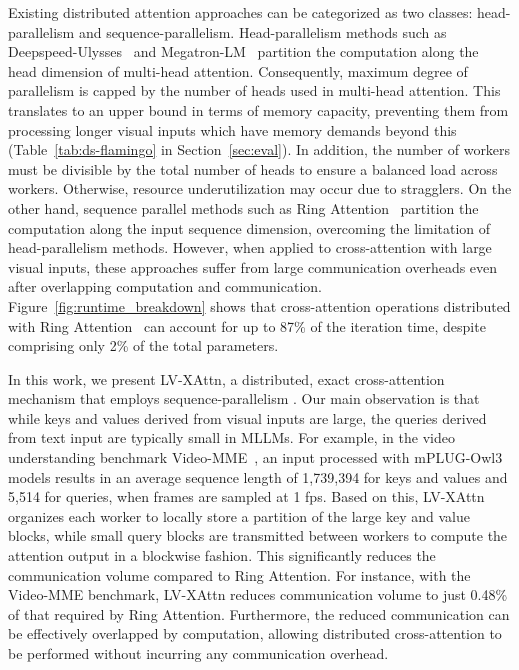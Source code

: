 Existing distributed attention approaches can be categorized as two classes: head-parallelism and sequence-parallelism. Head-parallelism methods such as Deepspeed-Ulysses~\cite{jacobs2024ds} and Megatron-LM~\cite{korthikanti2023megatron-lm} partition the computation along the head dimension of multi-head attention. Consequently, maximum degree of parallelism is capped by the number of heads used in multi-head attention. This translates to an upper bound in terms of memory capacity, preventing them from processing longer visual inputs which have memory demands beyond this (Table~\ref{tab:ds-flamingo} in Section~\ref{sec:eval}). In addition, the number of workers must be divisible by the total number of heads to ensure a balanced load across workers. Otherwise, resource underutilization may occur due to stragglers. On the other hand, sequence parallel methods such as Ring Attention~\cite{liu2024ring} partition the computation along the input sequence dimension, overcoming the limitation of head-parallelism methods. However, when applied to cross-attention with large visual inputs, these approaches suffer from large communication overheads even after overlapping computation and communication. Figure~\ref{fig:runtime_breakdown} shows that cross-attention operations distributed with Ring Attention~\cite{liu2024ring} can account for up to 87\% of the iteration time, despite comprising only 2\% of the total parameters.

In this work, we present LV-XAttn, a distributed, exact cross-attention mechanism that employs sequence-parallelism . Our main observation is that while keys and values derived from visual inputs are large, the queries derived from text input are typically small in MLLMs. For example, in the video understanding benchmark Video-MME~\cite{fu2024video-mme}, an input processed with mPLUG-Owl3 models results in an average sequence length of 1,739,394 for keys and values and 5,514 for queries, when frames are sampled at 1 fps. Based on this, LV-XAttn organizes each worker to locally store a partition of the large key and value blocks, while small query blocks are transmitted between workers to compute the attention output in a blockwise fashion. This significantly reduces the communication volume compared to Ring Attention. For instance, with the Video-MME benchmark, LV-XAttn reduces communication volume to just 0.48\% of that required by Ring Attention. Furthermore, the reduced communication can be effectively overlapped by computation, allowing distributed cross-attention to be performed without incurring any communication overhead.


